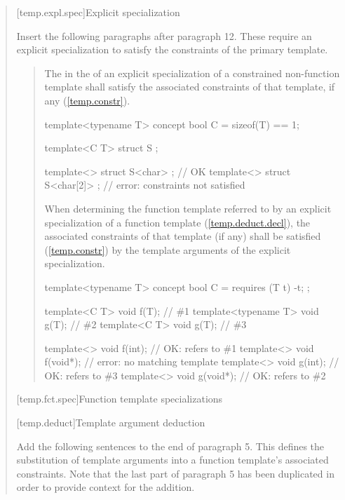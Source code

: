 \begin{quote}
[temp.expl.spec]{Explicit specialization}

Insert the following paragraphs after paragraph 12. These require
an explicit specialization to satisfy the constraints of the primary
template.

\begin{quote}
\begin{addedblock}
\setcounter{Paras}{12}
\pnum
The  in the
 of an explicit 
specialization of a constrained non-function template shall satisfy the 
associated constraints of that template, if any 
(\ref{temp.constr}).
% 
\enterexample
\begin{codeblock}
template<typename T> concept bool C = sizeof(T) == 1;

template<C T> struct S { };

template<> struct S<char> { };    // OK
template<> struct S<char[2]> { }; // error: constraints not satisfied
\end{codeblock}
\exitexample

\pnum
When determining the function template referred to by an explicit 
specialization of a function template (\ref{temp.deduct.decl}),
the associated constraints of that template (if any) shall be satisfied 
(\ref{temp.constr}) by the template arguments of the explicit specialization.

\enterexample
\begin{codeblock}
template<typename T> concept bool C = requires (T t) { -t; };

template<C T>        void f(T); // \#1
template<typename T> void g(T); // \#2
template<C T>        void g(T); // \#3

template<> void f(int);   // OK: refers to \#1
template<> void f(void*); // error: no matching template
template<> void g(int);   // OK: refers to \#3
template<> void g(void*); // OK: refers to \#2
\end{codeblock}
\exitexample
\end{addedblock}
\end{quote}


[temp.fct.spec]{Function template specializations}

[temp.deduct]{Template argument deduction}

Add the following sentences to the end of paragraph 5. This defines
the substitution of template arguments into a function template's
associated constraints. Note that the last part of paragraph 5
has been duplicated in order to provide context for the addition.


\end{quote}
